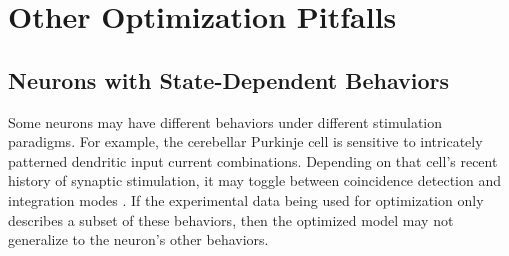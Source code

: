 
\section{Other Optimization Pitfalls}
\subsection{Neurons with State-Dependent Behaviors}
Some neurons may have different behaviors under different stimulation paradigms. 
For example, the cerebellar Purkinje cell is sensitive to intricately patterned dendritic input current combinations.
Depending on that cell’s recent history of synaptic stimulation, it may toggle between coincidence detection and integration modes \cite{ratte2013impact}.
If the experimental data being used for optimization only describes a subset of these behaviors, then the optimized model may not generalize to the neuron's other behaviors.






